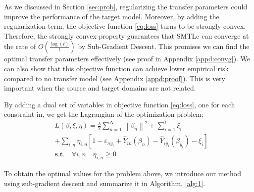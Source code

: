 As we discussed in Section \ref{sec:prob}, regularizing the transfer parameters could improve the performance of the target model. Moreover, by adding the regularization term, the objective function \eqref{eq:loss} turns to be strongly convex. Therefore, the strongly convex property guarantees that SMTLe can converge at the rate of $O(\frac{\log(t)}{t})$ by Sub-Gradient Descent. This promises we can find the optimal transfer parameters effectively (see proof in Appendix \ref{appd:convg}).
We can also show that this objective function can achieve lower empirical risk compared to no transfer model (see Appendix \ref{appd:proof}). This is very important when the source and target domains are not related.

 
By adding a dual set of variables in objective function \eqref{eq:loss}, one for each constraint in, we get the Lagrangian of the optimization problem:
\begin{equation}\label{eq:dual}
\begin{aligned}
 &L\left( {\beta ,\xi ,\eta } \right) =
 \frac{{{\lambda}}}{2}\sum\limits_{n = 1}^N {{{\left\| {{\beta _n}} \right\|}^2}}  + \sum\limits_{i = 1}^l {{\xi _i}} \\
   &+ \sum\limits_{i,n} {{\eta _{i,n}}\left[ {1 - {\varepsilon _{n{y_i}}} + {{\hat Y}_{in}}\left( {\beta_n } \right) - {{\hat Y}_{i{y_i}}}\left( {\beta_{y_i} } \right) - {\xi _i}} \right]}  \\
 &\textbf{s.t.} \quad  \forall i,n \quad {} {\eta _{i,n}} \ge 0
\end{aligned}
\end{equation}

To obtain the optimal values for the problem above, we introduce our method using sub-gradient descent \cite{BoydCO} and summarize it in Algorithm. \ref{alg:1}. 


